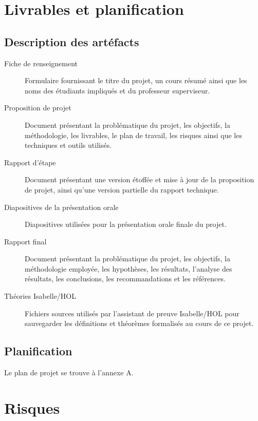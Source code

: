 \documentclass[a4paper, oneside, 12pt, titlepage]{article}
\begin{document}
\section{Livrables et planification}

\subsection{Description des artéfacts}


\begin{description}
  \item[Fiche de renseignement]
    Formulaire fournissant le titre du projet, un cours résumé ainsi que les noms des étudiants
    impliqués et du professeur superviseur.
  \item[Proposition de projet]
    Document présentant la problématique du projet, les objectifs, la méthodologie, les livrables,
    le plan de travail, les risques ainsi que les techniques et outils utilisés.
  \item[Rapport d'étape]
    Document présentant une version étoffée et mise à jour de la proposition de projet, ainsi qu'une
    version partielle du rapport technique.
  \item[Diapositives de la présentation orale]
    Diapositives utilisées pour la présentation orale finale du projet.
  \item[Rapport final]
    Document présentant la problématique du projet, les objectifs, la méthodologie employée, les
    hypothèses, les résultats, l'analyse des résultats, les conclusions, les recommandations et les
    références.
  \item[Théories Isabelle/HOL]
    Fichiers sources utilisés par l'assistant de preuve Isabelle/HOL pour sauvegarder les
    définitions et théorèmes formalisés au cours de ce projet.
\end{description}

\subsection{Planification}


Le plan de projet se trouve à l'annexe A.

\section{Risques}
\end{document}
